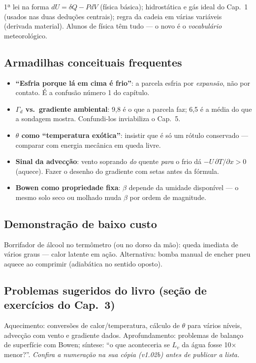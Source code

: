 1ª lei na forma $dU = \delta Q - PdV$ (física básica); hidrostática e gás
ideal do Cap.~1 (usados nas duas deduções centrais); regra da cadeia em
várias variáveis (derivada material). Alunos de física têm tudo — o novo é
o \emph{vocabulário} meteorológico.

\subsection*{Armadilhas conceituais frequentes}

\begin{itemize}
  \item \textbf{``Esfria porque lá em cima é frio''}: a parcela esfria por
        \emph{expansão}, não por contato. É a confusão número 1 do capítulo.
  \item \textbf{$\Gamma_d$ vs.\ gradiente ambiental}: 9{,}8 é o que a
        parcela faz; 6{,}5 é a média do que a sondagem mostra. Confundi-los
        inviabiliza o Cap.~5.
  \item \textbf{$\theta$ como ``temperatura exótica''}: insistir que é só um
        rótulo conservado — comparar com energia mecânica em queda livre.
  \item \textbf{Sinal da advecção}: vento soprando \emph{do} quente
        \emph{para} o frio dá $-U\,\partial T/\partial x > 0$ (aquece).
        Fazer o desenho do gradiente com setas antes da fórmula.
  \item \textbf{Bowen como propriedade fixa}: $\beta$ depende da umidade
        disponível — o mesmo solo seco ou molhado muda $\beta$ por ordem de
        magnitude.
\end{itemize}

\subsection*{Demonstração de baixo custo}

Borrifador de álcool no termômetro (ou no dorso da mão): queda imediata de
vários graus — calor latente em ação. Alternativa: bomba manual de encher
pneu aquece ao comprimir (adiabática no sentido oposto).

\subsection*{Problemas sugeridos do livro (seção de exercícios do Cap.~3)}

Aquecimento: conversões de calor/temperatura, cálculo de $\theta$ para
vários níveis, advecção com vento e gradiente dados. Aprofundamento:
problemas de balanço de superfície com Bowen; síntese: ``o que aconteceria
se $L_v$ da água fosse 10× menor?''. \emph{Confira a numeração na sua cópia
(v1.02b) antes de publicar a lista.}

